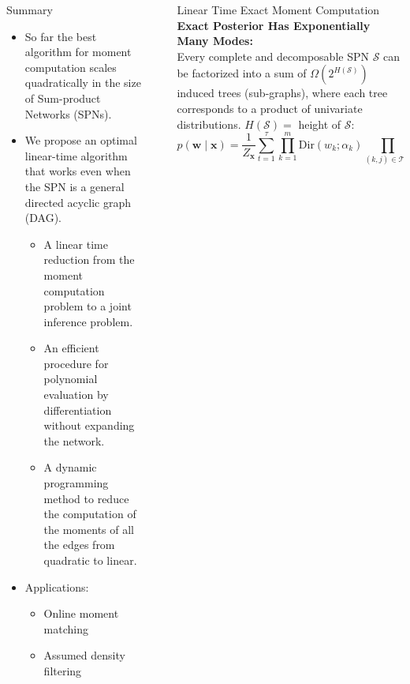 \documentclass[final,20pt]{beamer}
\newlength{\sepwid}
\newlength{\onecolwid}
\begin{document}
\begin{frame}[t]
\begin{columns}[t]
\begin{column}{\onecolwid}
\begin{block}{Summary}
\begin{itemize}
    \item   So far the best algorithm for moment computation scales quadratically in the size of Sum-product Networks (SPNs).
    \item   We propose an optimal linear-time algorithm that works even when the SPN is a general directed acyclic graph (DAG).
      \begin{itemize}
        \item   A linear time reduction from the moment computation problem to a joint inference problem.
        \item   An efficient procedure for polynomial evaluation by differentiation without expanding the network.
        \item   A dynamic programming method to reduce the computation of the moments of all the edges from quadratic to linear.
      \end{itemize}
    \item   Applications: 
      \begin{itemize}
        \item   Online moment matching
        \item   Assumed density filtering
      \end{itemize}
\end{itemize}
\end{block}
\end{column} %

\begin{column}{\sepwid}\end{column} %

\begin{column}{\onecolwid} 
\vspace*{-0.5in}
\begin{block}{Linear Time Exact Moment Computation}
\textcolor{CMURed}{\textbf{Exact Posterior Has Exponentially Many Modes:}}\\
Every complete and decomposable SPN $\mathcal{S}$ can be factorized into a sum of $\Omega(2^{H(\mathcal{S})})$ induced trees (sub-graphs), where each tree corresponds to a product of univariate distributions. $H(\mathcal{S}) = $ height of $\mathcal{S}$:
\begin{equation*}
p(\mathbf{w}\mid\mathbf{x}) = \frac{1}{Z_{\mathbf{x}}}\sum_{t=1}^{\tau}\prod_{k=1}^m\text{Dir}(w_k;\alpha_k)\prod_{(k, j)\in\mathcal{T}_{tE}}w_{k,j}\prod_{i=1}^n p_t(x_i)
\end{equation*}


\end{block}
\end{column}
\end{columns}
\end{frame}
\end{document}

